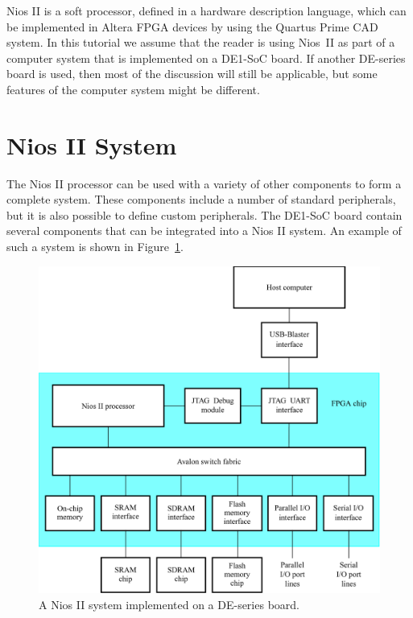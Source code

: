 \documentclass[11pt, twoside, pdftex]{article}
\begin{document}
Nios II is a soft processor, defined in a hardware description language,
which can be implemented in Altera FPGA devices by using the 
Quartus Prime CAD system. 
In this tutorial we assume that the reader is using Nios~II as part of a computer system
that is implemented on a DE1-SoC board. If another DE-series board is used, then most of
the discussion will still be applicable, but some features of the computer system might 
be different.

\section{Nios II System}
The Nios II processor can be used with a variety of other components to form 
a complete system. These components include a number of standard peripherals, 
but it is also possible to define custom peripherals. The DE1-SoC board
contain several components that can be integrated
into a Nios II system. An example of such a system is shown in Figure~\ref{fig:1}.
 
\begin{figure}[H]
   \begin{center}
      \includegraphics[scale=0.85]{figures/figure1.png}
   \caption{A Nios II system implemented on a DE-series board.} 
	 \label{fig:1}
	 \end{center}
\end{figure}
\end{document}

